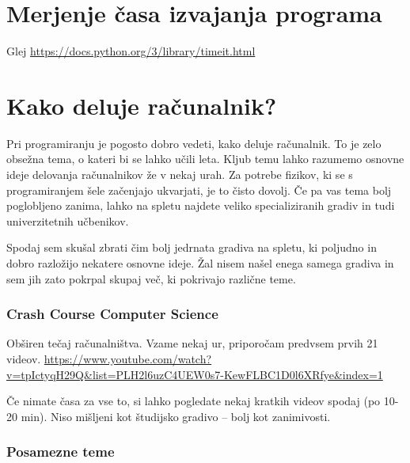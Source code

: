 \documentclass[
]{report}
\begin{document}
\hypertarget{merjenje-ux10dasa-izvajanja-programa}{%
\section{Merjenje časa izvajanja programa}\label{merjenje-ux10dasa-izvajanja-programa}}

Glej \url{https://docs.python.org/3/library/timeit.html}

\hypertarget{kako-deluje-raux10dunalnik}{%
\section{Kako deluje računalnik?}\label{kako-deluje-raux10dunalnik}}

Pri programiranju je pogosto dobro vedeti, kako deluje računalnik. To je zelo obsežna tema, o kateri bi se lahko učili leta. Kljub temu lahko razumemo osnovne ideje delovanja računalnikov že v nekaj urah. Za potrebe fizikov, ki se s programiranjem šele začenjajo ukvarjati, je to čisto dovolj. Če pa vas tema bolj poglobljeno zanima, lahko na spletu najdete veliko specializiranih gradiv in tudi univerzitetnih učbenikov.

Spodaj sem skušal zbrati čim bolj jedrnata gradiva na spletu, ki poljudno in dobro razložijo nekatere osnovne ideje. Žal nisem našel enega samega gradiva in sem jih zato pokrpal skupaj več, ki pokrivajo različne teme.

\hypertarget{crash-course-computer-science}{%
\subsubsection*{Crash Course Computer Science}\label{crash-course-computer-science}}

Obširen tečaj računalništva. Vzame nekaj ur, priporočam predvsem prvih 21 videov.
\url{https://www.youtube.com/watch?v=tpIctyqH29Q\&list=PLH2l6uzC4UEW0s7-KewFLBC1D0l6XRfye\&index=1}

Če nimate časa za vse to, si lahko pogledate nekaj kratkih videov spodaj (po 10-20 min). Niso mišljeni kot študijsko gradivo -- bolj kot zanimivosti.

\hypertarget{posamezne-teme}{%
\subsubsection*{Posamezne teme}\label{posamezne-teme}}
\end{document}
